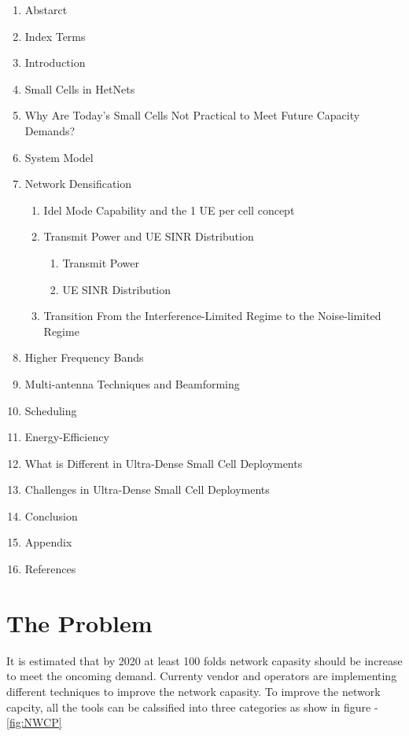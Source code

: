 \documentclass[12pt,conference,onecolumn]{IEEEtran}
\begin{document}
 \renewcommand{\theenumi}{\Roman{enumi}}
 \begin{enumerate}
   \item Abstarct
   \item Index Terms
   \item Introduction
   \item Small Cells in HetNets
   \item Why Are Today's Small Cells Not Practical to Meet Future Capacity Demands?
   \item System Model
   \item Network Densification
   \begin{enumerate}
     \item Idel Mode Capability and the 1 UE per cell concept
     \item Transmit Power and UE SINR Distribution
     \begin{enumerate}
     \item Transmit Power
     \item UE SINR Distribution
     \end{enumerate}
     \item Transition From the Interference-Limited Regime to the Noise-limited Regime
     \end{enumerate}
   \item Higher Frequency Bands
   \item Multi-antenna Techniques and Beamforming
   \item Scheduling
   \item Energy-Efficiency
   \item What is Different in Ultra-Dense Small Cell Deployments
   \item Challenges in Ultra-Dense Small Cell Deployments
   \item Conclusion
   \item Appendix
   \item References
 \end{enumerate}

\section{The Problem}
\label{sec:TP}
It is estimated that by 2020 at least 100 folds network capasity should be increase to meet the oncoming demand. Currenty vendor and operators are implementing different techniques to improve the network capasity. To improve the network capcity, all the tools can be calssified into three categories as show in figure - \ref{fig:NWCP}
\end{document}

